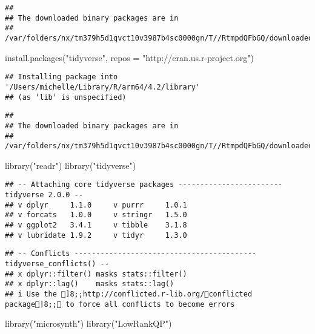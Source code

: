 \documentclass[
]{article}
\newenvironment{Shaded}{\begin{snugshade}}{\end{snugshade}}
\newcommand{\AttributeTok}[1]{\textcolor[rgb]{0.77,0.63,0.00}{#1}}
\newcommand{\FunctionTok}[1]{\textcolor[rgb]{0.00,0.00,0.00}{#1}}
\newcommand{\NormalTok}[1]{#1}
\newcommand{\StringTok}[1]{\textcolor[rgb]{0.31,0.60,0.02}{#1}}
\begin{document}
\begin{verbatim}
## 
## The downloaded binary packages are in
##  /var/folders/nx/tm379h5d1qvct10v3987b4sc0000gn/T//RtmpdQFbGQ/downloaded_packages
\end{verbatim}

\begin{Shaded}
\begin{Highlighting}[]
\FunctionTok{install.packages}\NormalTok{(}\StringTok{"tidyverse"}\NormalTok{, }\AttributeTok{repos =} \StringTok{"http://cran.us.r{-}project.org"}\NormalTok{)}
\end{Highlighting}
\end{Shaded}

\begin{verbatim}
## Installing package into '/Users/michelle/Library/R/arm64/4.2/library'
## (as 'lib' is unspecified)
\end{verbatim}

\begin{verbatim}
## 
## The downloaded binary packages are in
##  /var/folders/nx/tm379h5d1qvct10v3987b4sc0000gn/T//RtmpdQFbGQ/downloaded_packages
\end{verbatim}

\begin{Shaded}
\begin{Highlighting}[]
\FunctionTok{library}\NormalTok{(}\StringTok{"readr"}\NormalTok{)}
\FunctionTok{library}\NormalTok{(}\StringTok{"tidyverse"}\NormalTok{)}
\end{Highlighting}
\end{Shaded}

\begin{verbatim}
## -- Attaching core tidyverse packages ------------------------ tidyverse 2.0.0 --
## v dplyr     1.1.0     v purrr     1.0.1
## v forcats   1.0.0     v stringr   1.5.0
## v ggplot2   3.4.1     v tibble    3.1.8
## v lubridate 1.9.2     v tidyr     1.3.0
\end{verbatim}

\begin{verbatim}
## -- Conflicts ------------------------------------------ tidyverse_conflicts() --
## x dplyr::filter() masks stats::filter()
## x dplyr::lag()    masks stats::lag()
## i Use the ]8;;http://conflicted.r-lib.org/conflicted package]8;; to force all conflicts to become errors
\end{verbatim}

\begin{Shaded}
\begin{Highlighting}[]
\FunctionTok{library}\NormalTok{(}\StringTok{"microsynth"}\NormalTok{)}
\FunctionTok{library}\NormalTok{(}\StringTok{"LowRankQP"}\NormalTok{)}
\end{Highlighting}
\end{Shaded}
\end{document}
